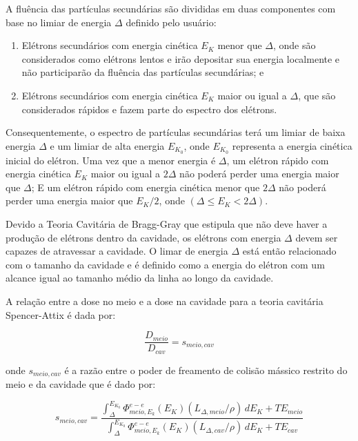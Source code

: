 \documentclass[11pt,a4paper]{article}
\begin{document}
			A fluência das partículas secundárias são divididas em duas componentes com base no limiar de energia $\Delta$ definido pelo usuário:

			\begin{enumerate}
				\item Elétrons secundários com energia cinética $E_K$ menor que $\Delta$, onde são considerados como elétrons lentos e irão depositar sua energia localmente e não participarão da fluência das partículas secundárias; e
				\item Elétrons secundários com energia cinética $E_K$ maior ou igual a $\Delta$, que são considerados rápidos e fazem parte do espectro dos elétrons. 
			\end{enumerate}

			Consequentemente, o espectro de partículas secundárias terá um limiar de baixa energia $\Delta$ e um limiar de alta energia $E_{K_0}$, onde $E_{K_0}$ representa a energia cinética inicial do elétron. Uma vez que a menor energia é $\Delta$, um elétron rápido com energia cinética $E_{K}$ maior ou igual a $2\Delta$ não poderá perder uma energia maior que $\Delta$; E um elétron rápido com energia cinética menor que $2\Delta$ não poderá perder uma energia maior que $E_K/2$, onde $(\Delta \leq E_K < 2\Delta)$. 

			Devido a Teoria Cavitária de Bragg-Gray que estipula que não deve haver a produção de elétrons dentro da cavidade, os elétrons com energia $\Delta$ devem ser capazes de atravessar a cavidade. O limar de energia $\Delta$ está então relacionado com o tamanho da cavidade e é definido como a energia do elétron com um alcance igual ao tamanho médio da linha ao longo da cavidade. 

			A relação entre a dose no meio e a dose na cavidade para a teoria cavitária Spencer-Attix é dada por:

				\begin{equation}
					\frac{D_{meio}}{D_{cav}} = s_{meio,cav}
				\end{equation}

			\noindent onde $s_{meio,cav}$ é a razão entre o poder de freamento de colisão mássico restrito do meio e da cavidade que é dado por:

			
			\begin{equation}
				s_{meio,cav}
				= \frac{\int_{\Delta}^{E_{K_0}} \Phi_{meio, E_k}^{e-e}(E_K)(L_{\Delta , meio}/\rho)\,dE_K + TE_{meio}}
				{\int_{\Delta}^{E_{K_0}} \Phi_{meio, E_k}^{e-e}(E_K)(L_{\Delta , cav}/\rho)\,dE_K + TE_{cav}}
			\end{equation}
\end{document}
